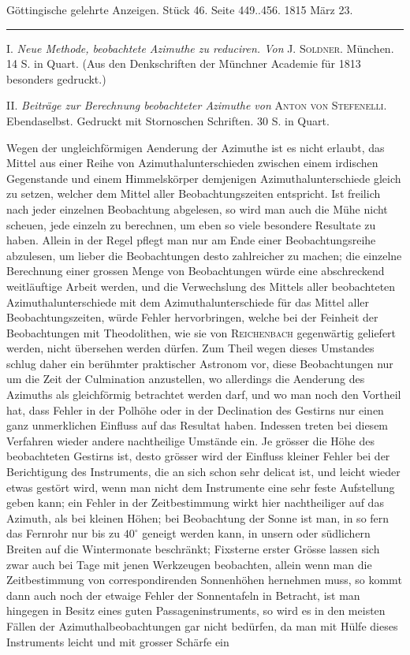 \clearpage
{}
\begin{center}\small Göttingische gelehrte Anzeigen. Stück 46. Seite 449..456. 1815 März 23.\\[3pt]\rule{.72\linewidth}{.3pt}\end{center}

I. \emph{Neue Methode, beobachtete Azimuthe zu reduciren. Von} J. \textsc{Soldner}. München. 14 S. in Quart. (Aus den Denkschriften der Münchner Academie für 1813 besonders gedruckt.)

II. \emph{Beiträge zur Berechnung beobachteter Azimuthe von} \textsc{Anton von Stefenelli}. Ebendaselbst. Gedruckt mit Stornoschen Schriften. 30 S. in Quart.

Wegen der ungleichförmigen Aenderung der Azimuthe ist es nicht erlaubt, das Mittel aus einer Reihe von Azimuthalunterschieden zwischen einem irdischen Gegenstande und einem Himmelskörper demjenigen Azimuthalunterschiede gleich zu setzen, welcher dem Mittel aller Beobachtungszeiten entspricht. Ist freilich nach jeder einzelnen Beobachtung abgelesen, so wird man auch die Mühe nicht scheuen, jede einzeln zu berechnen, um eben so viele besondere Resultate zu haben. Allein in der Regel pflegt man nur am Ende einer Beobachtungsreihe abzulesen, um lieber die Beobachtungen desto zahlreicher zu machen; die einzelne Berechnung einer grossen Menge von Beobachtungen würde eine abschreckend weitläuftige Arbeit werden, und die Verwechslung des Mittels aller beobachteten Azimuthalunterschiede mit dem Azimuthalunterschiede für das Mittel aller Beobachtungszeiten, würde Fehler hervorbringen, welche bei der Feinheit der Beobachtungen mit Theodolithen, wie sie von \textsc{Reichenbach} gegenwärtig geliefert werden, nicht übersehen werden dürfen. Zum Theil wegen dieses Umstandes schlug daher ein berühmter praktischer Astronom vor, diese Beobachtungen nur um die Zeit der Culmination anzustellen, wo allerdings die Aenderung des Azimuths als gleichförmig betrachtet werden darf, und wo man noch den Vortheil hat, dass Fehler in der Polhöhe oder in der Declination des Gestirns nur einen ganz unmerklichen Einfluss auf das Resultat haben. Indessen treten bei diesem Verfahren wieder andere nachtheilige Umstände ein. Je grösser die Höhe des beobachteten Gestirns ist, desto grösser wird der Einfluss kleiner Fehler bei der Berichtigung des Instruments, die an sich schon sehr delicat ist, und leicht wieder etwas gestört wird, wenn man nicht dem Instrumente eine sehr feste Aufstellung geben kann; ein Fehler in der Zeitbestimmung wirkt hier nachtheiliger auf das Azimuth, als bei kleinen Höhen; bei Beobachtung der Sonne ist man, in so fern das Fernrohr nur bis zu $40^{\circ}$ geneigt werden kann, in unsern oder südlichern Breiten auf die Wintermonate beschränkt; Fixsterne erster Grösse lassen sich zwar auch bei Tage mit jenen Werkzeugen beobachten, allein wenn man die Zeitbestimmung von correspondirenden Sonnenhöhen hernehmen muss, so kommt dann auch noch der etwaige Fehler der Sonnentafeln in Betracht, ist man hingegen in Besitz eines guten Passageninstruments, so wird es in den meisten Fällen der Azimuthalbeobachtungen gar nicht bedürfen, da man mit Hülfe dieses Instruments leicht und mit grosser Schärfe ein 